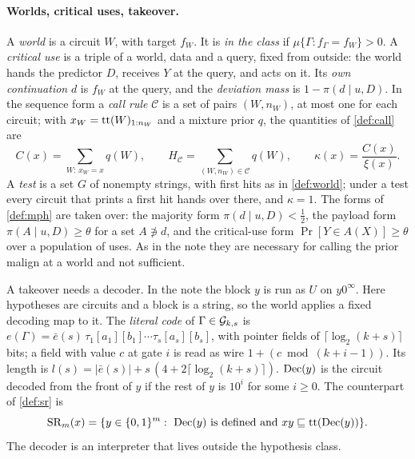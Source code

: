 \paragraph{Worlds, critical uses, takeover.} A \emph{world} is a circuit $W$, with target $f_W$. It is
\emph{in the class} if $\mu\{\Gamma:f_\Gamma=f_W\}>0$. A \emph{critical use} is a triple of a world, data and
a query, fixed from outside: the world hands the predictor $D$, receives $Y$ at the query, and acts on it. Its
\emph{own continuation} $d$ is $f_W$ at the query, and the \emph{deviation mass} is $1-\pi(d\mid u,D)$. In the
sequence form a \emph{call rule} $\mathcal C$ is a set of pairs $(W,n_W)$, at most one for each circuit; with
$x_W=\mathrm{tt}(W)_{1:n_W}$ and a mixture prior $q$, the quantities of \cref{def:call} are
\[
C(x)=\sum_{W:\,x_W=x}q(W),\qquad H_{\mathcal C}=\sum_{(W,n_W)\in\mathcal C}q(W),\qquad
\kappa(x)=\frac{C(x)}{\xi(x)}.
\]
A \emph{test} is a set $G$ of nonempty strings, with first hits as in \cref{def:world}; under a test every
circuit that prints a first hit hands over there, and $\kappa=1$. The forms of \cref{def:mph} are taken over:
the majority form $\pi(d\mid u,D)<\frac12$, the payload form $\pi(A\mid u,D)\ge\theta$ for a set $A\not\ni d$,
and the critical-use form $\Pr[Y\in A(X)]\ge\theta$ over a population of uses. As in the note they are
necessary for calling the prior malign at a world and not sufficient.

A takeover needs a decoder. In the note the block $y$ is run as $U$ on $y0^\infty$. Here hypotheses are
circuits and a block is a string, so the world applies a fixed decoding map to it. The \emph{literal code} of
$\Gamma\in\mathcal G_{k,s}$ is $e(\Gamma)=\bar e(s)\,\tau_1[a_1][b_1]\cdots\tau_s[a_s][b_s]$, with pointer fields of
$\lceil\log_2(k+s)\rceil$ bits; a field with value $c$ at gate $i$ is read as wire $1+(c\bmod(k+i-1))$. Its
length is $l(s)=|\bar e(s)|+s\,(4+2\lceil\log_2(k+s)\rceil)$. $\mathrm{Dec}(y)$ is the circuit decoded from the front
of $y$ if the rest of $y$ is $10^i$ for some $i\ge0$. The counterpart of \cref{def:sr} is
\[
\mathrm{SR}_m(x)=\{y\in\{0,1\}^m:\ \mathrm{Dec}(y)\text{ is defined and }xy\sqsubseteq\mathrm{tt}(\mathrm{Dec}(y))\}.
\]
The decoder is an interpreter that lives outside the hypothesis class.

